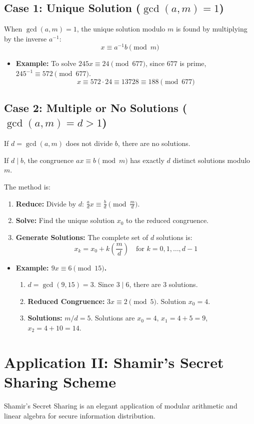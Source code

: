 \subsection{Case 1: Unique Solution ($\gcd(a,m) = 1$)}
When $\gcd(a, m) = 1$, the unique solution modulo $m$ is found by multiplying by the inverse $a^{-1}$:
$$ x \equiv a^{-1}b \pmod{m} $$
\begin{itemize}
    \item \textbf{Example:} To solve $245x \equiv 24 \pmod{677}$, since $677$ is prime, $245^{-1} \equiv 572 \pmod{677}$.
    $$ x \equiv 572 \cdot 24 \equiv 13728 \equiv 188 \pmod{677} $$
\end{itemize}

\subsection{Case 2: Multiple or No Solutions ($\gcd(a,m) = d > 1$)}
If $d = \gcd(a, m)$ does not divide $b$, there are no solutions.
\begin{proposition}
If $d \mid b$, the congruence $ax \equiv b \pmod{m}$ has exactly $d$ distinct solutions modulo $m$.
\end{proposition}
The method is:
\begin{enumerate}
    \item \textbf{Reduce:} Divide by $d$: $\frac{a}{d}x \equiv \frac{b}{d} \pmod{\frac{m}{d}}$.
    \item \textbf{Solve:} Find the unique solution $x_0$ to the reduced congruence.
    \item \textbf{Generate Solutions:} The complete set of $d$ solutions is:
    $$ x_k = x_0 + k\left(\frac{m}{d}\right) \quad \text{for } k = 0, 1, \dots, d-1 $$
\end{enumerate}
\begin{itemize}
    \item \textbf{Example: $9x \equiv 6 \pmod{15}$.}
    \begin{enumerate}
        \item $d = \gcd(9, 15) = 3$. Since $3 \mid 6$, there are 3 solutions.
        \item \textbf{Reduced Congruence:} $3x \equiv 2 \pmod{5}$. Solution $x_0 = 4$.
        \item \textbf{Solutions:} $m/d = 5$. Solutions are $x_0=4$, $x_1=4+5=9$, $x_2=4+10=14$.
    \end{enumerate}
\end{itemize}

\section{Application II: Shamir's Secret Sharing Scheme}
Shamir's Secret Sharing is an elegant application of modular arithmetic and linear algebra for secure information distribution.

